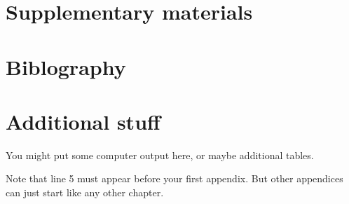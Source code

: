 \documentclass{monashthesis}
\begin{document}
\chapter{Supplementary materials}\label{supplementary-materials}

\chapter{Biblography}\label{biblography}

\appendix

\chapter{Additional stuff}\label{additional-stuff}

You might put some computer output here, or maybe additional tables.

Note that line 5 must appear before your first appendix. But other
appendices can just start like any other chapter.

\printbibliography[heading=bibintoc]
\end{document}
